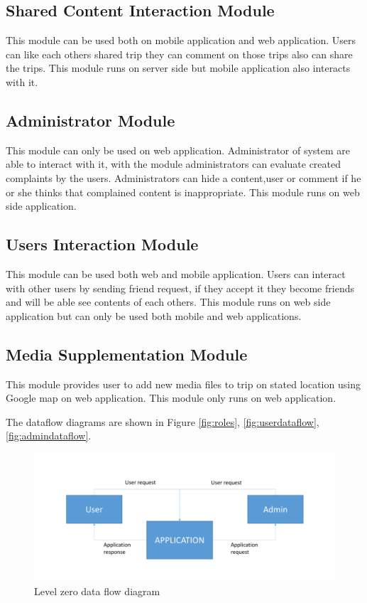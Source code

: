 \subsection{Shared Content Interaction Module}    
This module can be used both on mobile application and web application. Users can like each others shared trip they can comment on those trips also can share the trips. This module runs on server side but mobile application also interacts with it.

\subsection{Administrator Module}
This module can only be used on web application. Administrator of system are able to interact with it, with the module administrators can evaluate created complaints by the users. Administrators can hide a content,user or comment if he or she thinks that complained content is inappropriate. This module runs on web side application.

\subsection{Users Interaction Module}
This module can be used both web and mobile application. Users can interact with other users by sending friend request, if they accept it they become friends and will be able see contents of each others. This module runs on web side application but can only be used both mobile and web applications.

\subsection{Media Supplementation Module}
This module provides user to add new media files to trip on stated location using Google map on web application. This module only runs on web application.


The dataflow diagrams are shown in Figure \ref{fig:roles}, \ref{fig:userdataflow}, \ref{fig:admindataflow}.


\begin{figure}[!htbp]
\centering
\includegraphics[width=\textwidth]{projectChapters/images/dataflow.png}
\caption{Level zero data flow diagram}
\label{fig:dataflow}
\end{figure}

